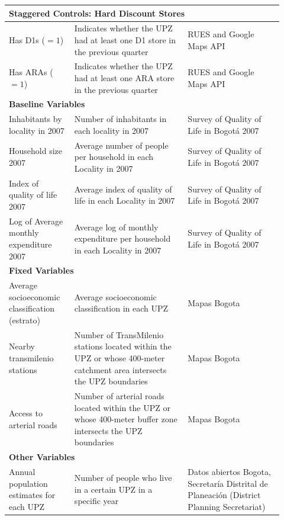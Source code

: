 \documentclass[12pt]{article}
\begin{document}
\begin{longtable}{p{0.22\linewidth} p{0.38\linewidth} p{0.32\linewidth}}
    \midrule
    \multicolumn{3}{l}{\textbf{Staggered Controls: Hard Discount Stores}} \\
    \midrule
    Has D1s ($=1$)  & Indicates whether the UPZ had at least one D1 store in the previous quarter  & RUES and Google Maps API \\
    Has ARAs ($=1$) & Indicates whether the UPZ had at least one ARA store in the previous quarter & RUES and Google Maps API \\

    \midrule
    \multicolumn{3}{l}{\textbf{Baseline Variables}} \\
    \midrule
    Inhabitants by locality in 2007         & Number of inhabitants in each locality in 2007                            & Survey of Quality of Life in Bogotá 2007 \\
    Household size 2007                     & Average number of people per household in each Locality in 2007           & Survey of Quality of Life in Bogotá 2007 \\
    Index of quality of life 2007           & Average index of quality of life in each Locality in 2007                 & Survey of Quality of Life in Bogotá 2007 \\
    Log of Average monthly expenditure 2007 & Average log of monthly expenditure per household in each Locality in 2007 & Survey of Quality of Life in Bogotá 2007 \\

    \midrule
        \multicolumn{3}{l}{\textbf{Fixed Variables}} \\
    \midrule
    Average socioeconomic classification (estrato)  & Average socioeconomic classification in each UPZ                                                                       & Mapas Bogota \\
    Nearby transmilenio stations                    & Number of TransMilenio stations located within the UPZ or whose 400-meter catchment area intersects the UPZ boundaries & Mapas Bogota \\
    Access to arterial roads                        & Number of arterial roads located within the UPZ or whose 400-meter buffer zone intersects the UPZ boundaries           & Mapas Bogota \\

    \midrule
    \multicolumn{3}{l}{\textbf{Other Variables}} \\
    \midrule
    Annual population estimates for each UPZ  &  Number of people who live in a certain UPZ in a specific year  & Datos abiertos Bogota, Secretaría Distrital de Planeación (District Planning Secretariat) \\

\end{longtable}
\end{document}
